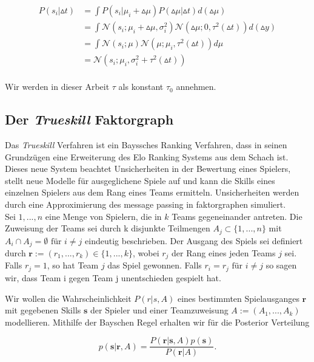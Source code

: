 \documentclass[12pt,a4paper]{scrartcl}
\numberwithin{equation}{section}
\begin{document}
\begin{equation}
\begin{split}
 P(s_i|\vartriangle t ) &= \int P(s_i| \mu_i + \vartriangle \mu)P(\vartriangle \mu | \vartriangle t) d(\vartriangle \mu) \\
 &= \int \mathcal{N}(s_i; \mu_i + \vartriangle \mu, \sigma_i^2)  \mathcal{N}(\vartriangle \mu; 0, \tau^2(\vartriangle t)) d(\vartriangle y) \\
 &= \int \mathcal{N}(s_i;\mu)\mathcal{N}(\mu; \mu_i, \tau^2(\vartriangle t)) d \mu \\
 &= \mathcal{N}(s_i;\mu_i,\sigma_i^2 + \tau^2(\vartriangle t)) \\
 \end{split}
\end{equation}

Wir werden in dieser Arbeit $\tau$ als konstant $\tau_0$ annehmen.


\subsection{Der \textit{Trueskill} Faktorgraph}
 
Das \textit{Trueskill} Verfahren ist ein Bayssches Ranking Verfahren, dass in seinen Grundzügen eine Erweiterung des
Elo Ranking Systems aus dem Schach ist. 
Dieses neue System beachtet Unsicherheiten in der Bewertung eines Spielers, stellt neue Modelle für ausgeglichene
Spiele auf und kann die Skills eines einzelnen Spielers aus dem Rang eines Teams ermitteln. 
Unsicherheiten werden durch eine Approximierung des message passing in faktorgraphen simuliert.  
\\
 Sei ${1,...,n}$ eine Menge von Spielern, die in $k$ Teams gegeneinander antreten. Die Zuweisung der Teams sei durch k disjunkte Teilmengen
 $A_j \subset \{1,...,n\}$ mit $A_i \cap A_j = \emptyset \text{ für } i \neq j$ eindeutig beschrieben. Der Ausgang des Spiels sei definiert durch $\mathbf{r} := (r_1,...,r_k) \in \{1,...,k\}$,
 wobei $r_j$ der Rang eines jeden Teams $j$ sei. Falls $r_j = 1$, so hat Team $j$ das Spiel gewonnen. Falls $r_i = r_j \text{ für } i \neq j$ so sagen wir, dass Team i gegen Team j
 unentschieden gespielt hat. 
 
 Wir wollen die Wahrscheinlichkeit $P(r|s,A)$ eines bestimmten Spielausganges $\mathbf{r}$ mit gegebenen Skills $\mathbf{s}$ der Spieler und einer Teamzuweisung $A := (A_1,...,A_k)$ modellieren. 
 Mithilfe der Bayschen Regel erhalten wir für die Posterior Verteilung
 
 \begin{equation}
  p(\mathbf{s}|\mathbf{r},A) = \frac{P(\mathbf{r}|\mathbf{s},A)p(\mathbf{s})}{P(\mathbf{r}|A)}.
 \end{equation}
\end{document}

